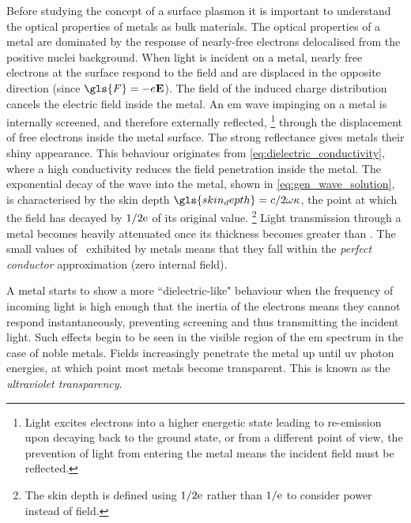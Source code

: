 \documentclass{article}
\begin{document}
Before studying the concept of a surface plasmon it is important to understand the optical properties of metals as bulk materials. The optical properties of a metal are dominated by the response of nearly-free electrons delocalised from the positive nuclei background. When light is incident on a metal, nearly free electrons at the surface respond to the field and are displaced in the opposite direction (since $\gls{F}=-e\vec{E}$). The field of the induced charge distribution cancels the electric field inside the metal. An \gls{em} wave impinging on a metal is internally screened{\color{red}, and therefore externally reflected,%
\footnote{Light excites electrons into a higher energetic state leading to re-emission upon decaying back to the ground state, or from a different point of view, the prevention of light from entering the metal means the incident field must be reflected.}
} through the displacement of free electrons inside the metal surface. The strong reflectance gives metals their shiny appearance. This behaviour originates from \eqref{eq:dielectric_conductivity}, where a high conductivity reduces the field penetration inside the metal. The exponential decay of the wave into the metal, shown in \eqref{eq:gen_wave_solution}, is characterised by the skin depth $\gls{skin_depth} = c/2\omega\kappa$, the point at which the field has decayed by $1/2\mathrm{e}$ of its original value.%
\footnote{The skin depth is defined using $1/2\mathrm{e}$ rather than $1/\mathrm{e}$ to consider power instead of field.}
Light transmission through a metal becomes heavily attenuated once its thickness becomes greater than \skindepth. The small values of \skindepth\ exhibited by metals means that they fall within the \textit{perfect conductor} approximation (zero internal field).

A metal starts to show a more ``dielectric-like" behaviour when the frequency of incoming light is high enough that the inertia of the electrons means they cannot respond instantaneously, preventing screening and thus transmitting the incident light. Such effects begin to be seen in the visible region of the \gls{em} spectrum in the case of noble metals. Fields increasingly penetrate the metal up until \gls{uv} photon energies, at which point most metals become transparent. This is known as the \textit{ultraviolet transparency}.
\end{document}
